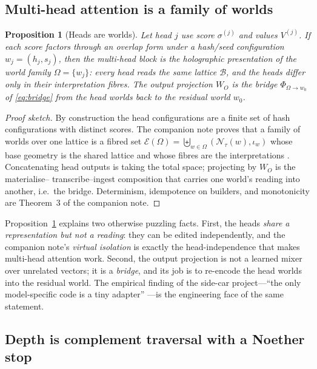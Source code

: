 \documentclass[11pt,a4paper]{article}
\newtheorem{proposition}[principle]{Proposition}
\theoremstyle{remark}
\newcommand{\Lat}{\ensuremath{\mathcal{B}}}            %
\newcommand{\World}{\ensuremath{w}}                     %
\newcommand{\iotaw}{\ensuremath{\iota_{w}}}             %
\newcommand{\Bnd}{\ensuremath{\Phi}}                    %
\newcommand{\sigm}{\ensuremath{\sigma}}                 %
\begin{document}
\subsection{Multi-head attention is a family of worlds}

\begin{proposition}[Heads are worlds]
\label{prop:heads}
Let head $j$ use score $\sigm^{(j)}$ and values $V^{(j)}$. If each score factors
through an overlap form under a hash/seed configuration $\World_j=(h_j,s_j)$,
then the multi-head block is the holographic presentation of the world family
$\Omega=\{\World_j\}$: every head reads the \emph{same} lattice $\Lat$, and the
heads differ only in their interpretation fibres. The output projection $W_O$
is the bridge $\Bnd_{\Omega\to\World_0}$ of \eqref{eq:bridge} from the head
worlds back to the residual world $\World_0$.
\end{proposition}

\begin{proof}[Proof sketch]
By construction the head configurations are a finite set of hash configurations
with distinct scores. The companion note proves that a family of worlds over one
lattice is a fibred set $\mathcal{E}(\Omega)=\biguplus_{\World\in\Omega}
(\mathcal{N}_\tau(\World),\iotaw)$ whose base geometry is the shared lattice and
whose fibres are the interpretations \cite{companion2026}. Concatenating head
outputs is taking the total space; projecting by $W_O$ is the materialise--
transcribe--ingest composition that carries one world's reading into another,
i.e.\ the bridge. Determinism, idempotence on builders, and monotonicity are
Theorem~3 of the companion note.
\end{proof}

Proposition~\ref{prop:heads} explains two otherwise puzzling facts. First, the
heads \emph{share a representation but not a reading}: they can be edited
independently, and the companion note's \emph{virtual isolation} is exactly the
head-independence that makes multi-head attention work. Second, the output
projection is not a learned mixer over unrelated vectors; it is a
\emph{bridge}, and its job is to re-encode the head worlds into the residual
world. The empirical finding of the side-car project---``the only model-specific
code is a tiny adapter'' \cite{companion2026}---is the engineering face of the
same statement.

\subsection{Depth is complement traversal with a Noether stop}
\end{document}
